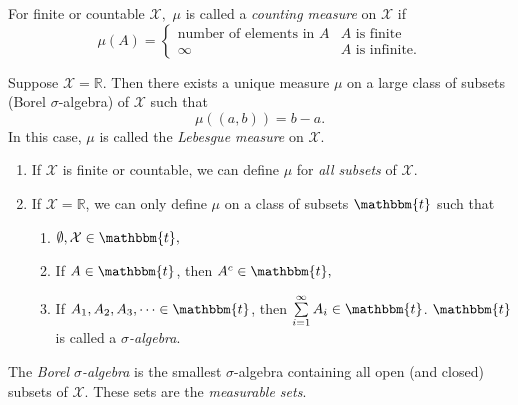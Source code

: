 \documentclass[a4paper]{article}
\begin{document}
\begin{eg}
	For finite or countable $\mathcal{X},$ $\mu$ is called a \emph{counting measure} on $\mathcal{X}$ if
	\begin{equation}
		\mu (A) =\left\{ 
		\begin{array}{ll}
			\text{number of elements in }A & A\text{ is finite} \\
			\infty & A\text{ is infinite.}
		\end{array} \right.
	\end{equation}
\end{eg}


\begin{eg}
	Suppose $\mathcal{X}=\mathbb{R}$. Then there exists a unique measure $\mu$ on a large class of subsets (Borel $\sigma$-algebra) of $\mathcal{X}$ such that
	\begin{equation}
		\mu\left((a,b)\right) = b-a.
	\end{equation}
In this case, $\mu$ is called the \emph{Lebesgue measure} on $\mathcal{X}$.
\end{eg}

\begin{remark}
	\quad
	\begin{enumerate}
		\item If $\mathcal{X}$ is finite or countable, we can define $\mu$ for \emph{all subsets} of $\mathcal{X}$.
		\item If $\mathcal{X} = \mathbb{R}$, we can only define $\mu$ on a class of subsets $\mathbbm{t}$ such that
		\begin{enumerate}
			\item $\emptyset, \mathcal{X} \in \mathbbm{t},$
			\item If $A \in \mathbbm{t}$, then $A^c \in \mathbbm{t},$
			\item If $A_1, A_2, A_3, \cdots \in \mathbbm{t}$, then $\sum\limits_{i = 1}^{\infty} A_i \in \mathbbm{t}$. $\mathbbm{t}$ is called a \emph{$\sigma$-algebra}.
		\end{enumerate}
	
	\end{enumerate}
	The \emph{Borel $\sigma$-algebra} is the smallest $\sigma$-algebra containing all open (and closed) subsets of $\mathcal{X}$. These sets are the \emph{measurable sets}.
\end{remark}
\end{document}

